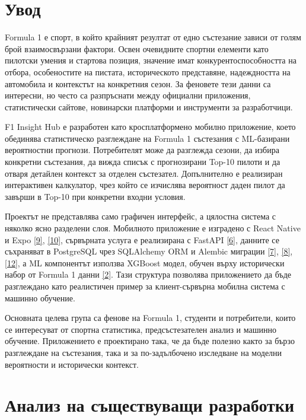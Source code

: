 \documentclass[12pt,a4paper]{article}
\newcommand{\bibref}[1]{\hyperref[ref:#1]{[#1]}}
\begin{document}
\tableofcontents
\newpage


\section{Увод}

Formula 1 е спорт, в който крайният резултат от едно състезание зависи от голям брой взаимосвързани фактори. Освен очевидните спортни елементи като пилотски умения и стартова позиция, значение имат конкурентоспособността на отбора, особеностите на пистата, историческото представяне, надеждността на автомобила и контекстът на конкретния сезон. За феновете тези данни са интересни, но често са разпръснати между официални приложения, статистически сайтове, новинарски платформи и инструменти за разработчици.

F1 Insight Hub е разработен като кросплатформено мобилно приложение, което обединява статистическо разглеждане на Formula 1 състезания с ML-базирани вероятностни прогнози. Потребителят може да разглежда сезони, да избира конкретни състезания, да вижда списък с прогнозирани Top-10 пилоти и да отваря детайлен контекст за отделен състезател. Допълнително е реализиран интерактивен калкулатор, чрез който се изчислява вероятност даден пилот да завърши в Top-10 при конкретни входни условия.

Проектът не представлява само графичен интерфейс, а цялостна система с няколко ясно разделени слоя. Мобилното приложение е изградено с React Native и Expo \bibref{9}, \bibref{10}, сървърната услуга е реализирана с FastAPI \bibref{6}, данните се съхраняват в PostgreSQL чрез SQLAlchemy ORM и Alembic миграции \bibref{7}, \bibref{8}, \bibref{12}, а ML компонентът използва XGBoost модел, обучен върху исторически набор от Formula 1 данни \bibref{2}. Тази структура позволява приложението да бъде разглеждано като реалистичен пример за клиент-сървърна мобилна система с машинно обучение.

Основната целева група са фенове на Formula 1, студенти и потребители, които се интересуват от спортна статистика, предсъстезателен анализ и машинно обучение. Приложението е проектирано така, че да бъде полезно както за бързо разглеждане на състезания, така и за по-задълбочено изследване на моделни вероятности и исторически контекст.

\section{Анализ на съществуващи разработки}
\end{document}
